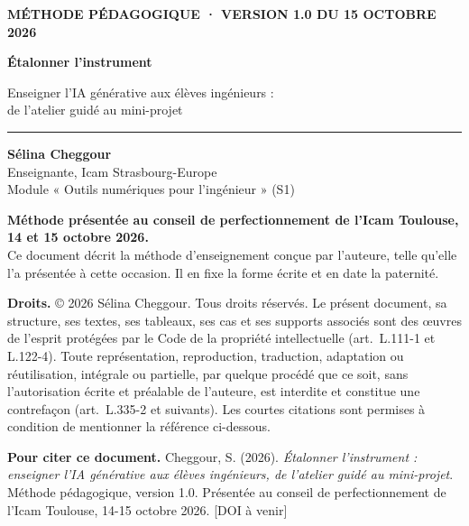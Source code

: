 \documentclass[11pt,a4paper]{article}
\newcommand{\auteure}{Sélina Cheggour}
\newcommand{\presente}{Méthode présentée au conseil de perfectionnement de l'Icam Toulouse, 14 et 15 octobre 2026}
\begin{document}
\thispagestyle{plain}
\begin{tcolorbox}[enhanced,colback=white,colframe=white,boxrule=0pt,arc=0pt,left=0pt,right=0pt,
  borderline west={4pt}{0pt}{icamorange}]
\hspace{6mm}\begin{minipage}{0.92\linewidth}
{\scriptsize\bfseries\color{icamred}MÉTHODE PÉDAGOGIQUE · VERSION 1.0 DU 15 OCTOBRE 2026}\par\vspace{4mm}
{\selectfont\fontsize{26}{31}\selectfont\bfseries Étalonner l'instrument\par}
\vspace{3mm}
{\large\color{icamgray}Enseigner l'IA générative aux élèves ingénieurs :\\ de l'atelier guidé au mini-projet\par}
\vspace{6mm}
{\color{icamorange}\rule{22mm}{1.5pt}}\par\vspace{3mm}
\textbf{\auteure}\\
Enseignante, Icam Strasbourg-Europe\\
Module « Outils numériques pour l'ingénieur » (S1)
\end{minipage}
\end{tcolorbox}

\vspace{6mm}
\begin{cadre}
\textbf{\presente.}\\[1mm]
Ce document décrit la méthode d'enseignement conçue par l'auteure, telle qu'elle l'a présentée
à cette occasion. Il en fixe la forme écrite et en date la paternité.
\end{cadre}

\vspace{2mm}
\begin{cadregris}
\small\textbf{Droits.} © 2026 \auteure. Tous droits réservés. Le présent document, sa
structure, ses textes, ses tableaux, ses cas et ses supports associés sont des œuvres de l'esprit
protégées par le Code de la propriété intellectuelle (art.~L.111-1 et L.122-4). Toute
représentation, reproduction, traduction, adaptation ou réutilisation, intégrale ou partielle,
par quelque procédé que ce soit, sans l'autorisation écrite et préalable de l'auteure, est
interdite et constitue une contrefaçon (art.~L.335-2 et suivants). Les courtes citations sont
permises à condition de mentionner la référence ci-dessous.

\medskip
\textbf{Pour citer ce document.} Cheggour, S. (2026). \emph{Étalonner l'instrument : enseigner
l'IA générative aux élèves ingénieurs, de l'atelier guidé au mini-projet}. Méthode pédagogique,
version 1.0. Présentée au conseil de perfectionnement de l'Icam Toulouse, 14-15 octobre 2026.
[DOI à venir]
\end{cadregris}
\end{document}
